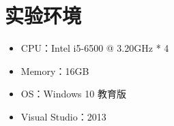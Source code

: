 \section {实验环境}
\begin{itemize}[noitemsep]
\item CPU：Intel i5-6500 @ 3.20GHz * 4
\item Memory：16GB
\item OS：Windows 10 教育版
\item Visual Studio：2013
\end{itemize}
